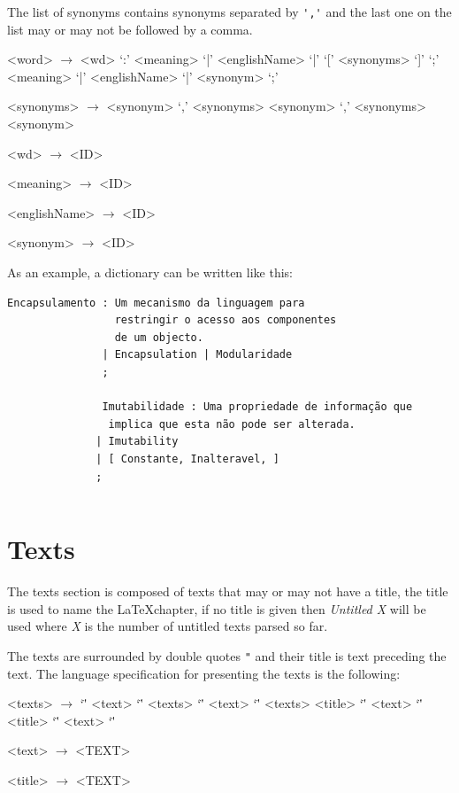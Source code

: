 \documentclass[a4paper]{report}
\begin{document}
The list of synonyms contains synonyms separated by \verb!','! and the last one
on the list may or may not be followed by a comma.

\begin{grammar}
    <word> $\to$ <wd> `:' <meaning> `|' <englishName> `|' `[' <synonyms> `]' `;'
    \alt <meaning> `|' <englishName> `|' <synonym> `;'

    <synonyms> $\to$ <synonym> `,'
    \alt <synonyms> <synonym> `,'
    \alt <synonyms> <synonym>

    <wd> $\to$ <ID>

    <meaning> $\to$ <ID>

    <englishName> $\to$ <ID>

    <synonym> $\to$ <ID>
\end{grammar}

As an example, a dictionary can be written like this:

\begin{verbatim}
Encapsulamento : Um mecanismo da linguagem para
                 restringir o acesso aos componentes
                 de um objecto.
               | Encapsulation | Modularidade
               ;

               Imutabilidade : Uma propriedade de informação que
                implica que esta não pode ser alterada.
              | Imutability
              | [ Constante, Inalteravel, ]
              ;
\end{verbatim}

\inputminted[firstline=17,lastline=36]{C}{../src/sati.y}

\section{Texts}\label{sec:texts}

The texts section is composed of texts that may or may not have a title, the
title is used to name the \LaTeX chapter, if no title is given then
\textit{Untitled X} will be used where \textit{X} is the number of untitled
texts parsed so far.

The texts are surrounded by double quotes \verb!"! and their title is text
preceding the text. The language specification for presenting the texts is the
following:

\begin{grammar}
    <texts> $\to$ `\"' <text> `\"'
    \alt <texts> `\"' <text> `\"'
    \alt <texts> <title> `\"' <text> `\"'
    \alt <title> `\"' <text> `\"'

    <text> $\to$ <TEXT>

    <title> $\to$ <TEXT>
\end{grammar}
\end{document}
